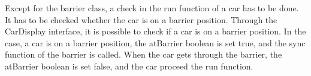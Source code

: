 Except for the barrier class, a check in the run function of a car has to be done. It has to be checked whether the car is on a barrier position. Through the CarDisplay interface, it is possible to check if a car is on a barrier position. In the case, a car is on a barrier position, the atBarrier boolean is set true, and the sync function of the barrier is called. When the car gets through the barrier, the atBarrier boolean is set false, and the car proceed the run function.